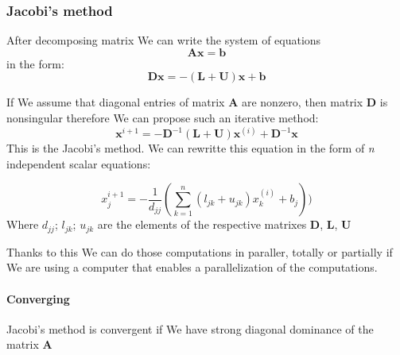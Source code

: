\documentclass{report}
\begin{document}
\subsubsection{Jacobi's method}
After decomposing matrix We can write the system of equations
\[ \mathbf{A}\mathbf{x} = \mathbf{b} \]
in the form:
\[ \mathbf{D}\mathbf{x} = -(\mathbf{L}+\mathbf{U})\mathbf{x}+\mathbf{b}
\]

If We assume that diagonal entries of matrix \textbf{A} are nonzero, then matrix \textbf{D} is nonsingular therefore We can propose such an iterative method:
\[ \mathbf{x}^{i+1} = -\mathbf{D}^{-1}(\mathbf{L}+\mathbf{U})\mathbf{x}^{(i)}+\mathbf{D}^{-1}\mathbf{x}
\]
This is the Jacobi's method.
We can rewritte this equation in the form of \textit{n} independent scalar equations:

\[
{x}_j^{i+1} = -\frac{1}{d_{jj}}(
\sum^n_{k=1} (l_{jk} + u_{jk})x_k^{(i)}+b_j)
) \]
Where $d_{jj}$; $l_{jk}$;  $u_{jk}$ are the elements of the respective matrixes \textbf{D}, \textbf{L}, \textbf{U}

Thanks to this We can do those computations in paraller, totally or partially if We are using a computer that enables a parallelization of the computations.

\paragraph{Converging}
Jacobi's method is convergent if We have strong diagonal dominance of the matrix \textbf{A}
\end{document}
